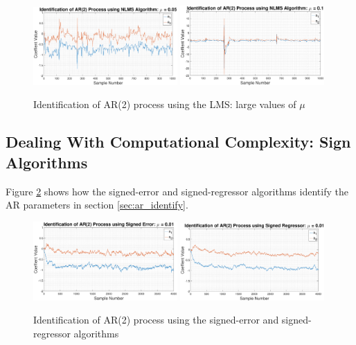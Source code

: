 \documentclass{article}
\begin{document}
\begin{figure}[H]
    \centering
    \includegraphics[width=0.49\textwidth]{lms_ar_identification_mu_point_05}
    \includegraphics[width=0.49\textwidth]{lms_ar_identification_mu_point_1}
    \caption{Identification of AR(2) process using the LMS: large values of $\mu$}
    \label{fig:lms_ar_identification_2}
\end{figure}

\newpage
\subsection{Dealing With Computational Complexity: Sign Algorithms}

Figure \ref{fig:signed_1} shows how the signed-error and signed-regressor algorithms identify the AR parameters in section \ref{sec:ar_identify}.

\begin{figure}[H]
    \centering
    \includegraphics[width=0.49\textwidth]{signed_error}
    \includegraphics[width=0.49\textwidth]{signed_regressor}
    \caption{Identification of AR(2) process using the signed-error and signed-regressor algorithms}
    \label{fig:signed_1}
\end{figure}
\end{document}

